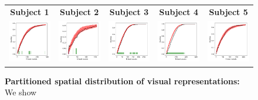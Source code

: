 \begin{figure}[ht]
\scriptsize
\vspace{2ex}
\hspace{-4ex}
\begin{tabular}{ccccc}
\textbf{\Large Subject 1} & \textbf{\Large Subject 2} & \textbf{\Large Subject 3} & \textbf{\Large Subject 4} & \textbf{\Large Subject 5}\\
{\includegraphics[width=.19\linewidth]{figures/part_II/locality/visual/locality_test_01.png}}
\hspace{0ex}
&{\includegraphics[width=.19\linewidth]{figures/part_II/locality/visual/locality_test_03.png}}
\hspace{0ex}
&{\includegraphics[width=.19\linewidth]{figures/part_II/locality/visual/locality_test_04.png}}
\hspace{0ex}
&{\includegraphics[width=.19\linewidth]{figures/part_II/locality/visual/locality_test_05.png}}
\hspace{0ex}
&{\includegraphics[width=.19\linewidth]{figures/part_II/locality/visual/locality_test_06.png}}
\hspace{-1ex} \\
\end{tabular}
\vspace{3ex}
\caption{\textbf{Partitioned spatial distribution of visual representations:} We show }
\label{fig:visual_locality}
\end{figure}


